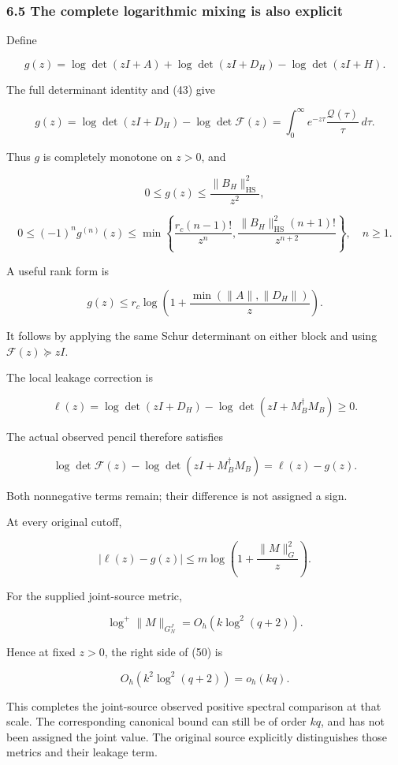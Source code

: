 \documentclass[11pt]{article}
\begin{document}
\subsubsection{6.5 The complete logarithmic mixing is also explicit}\label{the-complete-logarithmic-mixing-is-also-explicit}

Define

\[
g(z)
=
\log\det(zI+A)+\log\det(zI+D_H)
-\log\det(zI+H).
\]

The full determinant identity and (43) give

\[
\boxed{
g(z)
=
\log\det(zI+D_H)-\log\det\mathcal F(z)
=
\int_0^\infty e^{-z\tau}\frac{\mathcal Q(\tau)}{\tau}\,d\tau.
}
\tag{46}
\]

Thus \(g\) is completely monotone on \(z>0\), and

\[
\boxed{
0\le g(z)\le\frac{\|B_H\|_{\mathrm{HS}}^2}{z^2},
}
\]

\[
\boxed{
0\le(-1)^ng^{(n)}(z)
\le
\min\left\{
\frac{r_c(n-1)!}{z^n},
\frac{\|B_H\|_{\mathrm{HS}}^2(n+1)!}{z^{n+2}}
\right\},
\quad n\ge1.
}
\tag{47}
\]

A useful rank form is

\[
\boxed{
g(z)\le
r_c\log\left(
1+\frac{\min(\|A\|,\|D_H\|)}z
\right).
}
\tag{48}
\]

It follows by applying the same Schur determinant on either block and using \(\mathcal F(z)\succeq zI\).

The local leakage correction is

\[
\ell(z)
=
\log\det(zI+D_H)
-\log\det(zI+M_B^\dagger M_B)\ge0.
\]

The actual observed pencil therefore satisfies

\[
\boxed{
\log\det\mathcal F(z)
-\log\det(zI+M_B^\dagger M_B)
=
\ell(z)-g(z).
}
\tag{49}
\]

Both nonnegative terms remain; their difference is not assigned a sign.

At every original cutoff,

\[
\boxed{
|\ell(z)-g(z)|
\le
m\log\left(1+\frac{\|M\|_G^2}{z}\right).
}
\tag{50}
\]

For the supplied joint-source metric,

\[
\log^+\|M\|_{G_N^J}
=O_h(k\log^2(q+2)).
\]

Hence at fixed \(z>0\), the right side of (50) is

\[
O_h(k^2\log^2(q+2))=o_h(kq).
\tag{51}
\]

This completes the joint-source observed positive spectral comparison at that scale. The corresponding canonical bound can still be of order \(kq\), and has not been assigned the joint value. The original source explicitly distinguishes those metrics and their leakage term.
\end{document}
